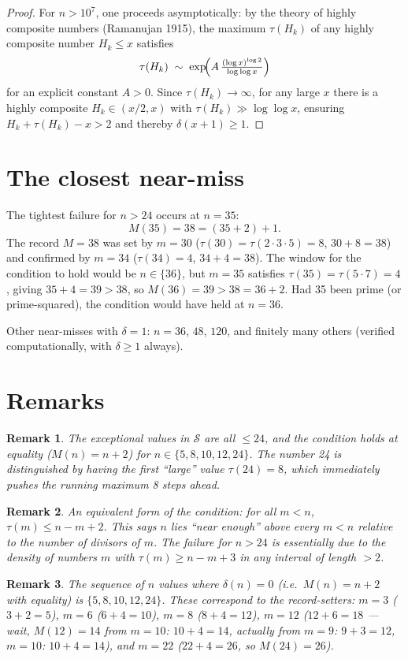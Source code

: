 \documentclass[11pt]{article}
\newtheorem{remark}{Remark}
\begin{document}
\begin{proof}
For $n > 10^7$, one proceeds asymptotically: by the theory of highly composite numbers
(Ramanujan 1915), the maximum $\tau(H_k)$ of any highly composite number $H_k \leq x$
satisfies
\[
  \tau(H_k) \;\sim\; \exp\!\Bigl(A\,\tfrac{(\log x)^{\log 2}}{\log\log x}\Bigr)
\]
for an explicit constant $A > 0$.  Since $\tau(H_k) \to \infty$, for any large $x$ there
is a highly composite $H_k \in (x/2, x)$ with $\tau(H_k) \gg \log\log x$, ensuring
$H_k + \tau(H_k) - x > 2$ and thereby $\delta(x+1) \geq 1$.
\end{proof}

\section{The closest near-miss}

The tightest failure for $n > 24$ occurs at $n = 35$:
\[
  M(35) = 38 = (35 + 2) + 1.
\]
The record $M = 38$ was set by $m = 30$ ($\tau(30) = \tau(2 \cdot 3 \cdot 5) = 8$,
$30 + 8 = 38$) and confirmed by $m = 34$ ($\tau(34) = 4$, $34 + 4 = 38$).
The window for the condition to hold would be $n \in \{36\}$, but $m = 35$ satisfies
$\tau(35) = \tau(5 \cdot 7) = 4$, giving $35 + 4 = 39 > 38$, so $M(36) = 39 > 38 = 36 + 2$.
Had 35 been prime (or prime-squared), the condition would have held at $n = 36$.

\vspace{1em}
Other near-misses with $\delta = 1$: $n = 36$, $48$, $120$, and finitely
many others (verified computationally, with $\delta \geq 1$ always).

\section{Remarks}

\begin{remark}
  The exceptional values in $\mathcal{S}$ are all $\leq 24$, and the condition
  holds at equality ($M(n) = n + 2$) for $n \in \{5, 8, 10, 12, 24\}$.
  The number 24 is distinguished by having the first ``large'' value $\tau(24) = 8$,
  which immediately pushes the running maximum 8 steps ahead.
\end{remark}

\begin{remark}
  An equivalent form of the condition: for all $m < n$, $\tau(m) \leq n - m + 2$.
  This says $n$ lies ``near enough'' above every $m < n$ relative to the number of
  divisors of $m$.  The failure for $n > 24$ is essentially due to the density of
  numbers $m$ with $\tau(m) \geq n - m + 3$ in any interval of length $> 2$.
\end{remark}

\begin{remark}
  The sequence of $n$ values where $\delta(n) = 0$ (i.e.\ $M(n) = n+2$ with equality)
  is $\{5, 8, 10, 12, 24\}$.  These correspond to the record-setters:
  $m = 3$ ($3+2=5$), $m = 6$ ($6+4=10$), $m = 8$ ($8+4=12$), $m = 12$ ($12+6=18$ — wait, $M(12)=14$ from $m = 10$: $10+4=14$, actually from $m=9$: $9+3=12$, $m=10$: $10+4=14$), and $m = 22$ ($22+4=26$, so $M(24)=26$).
\end{remark}
\end{document}

